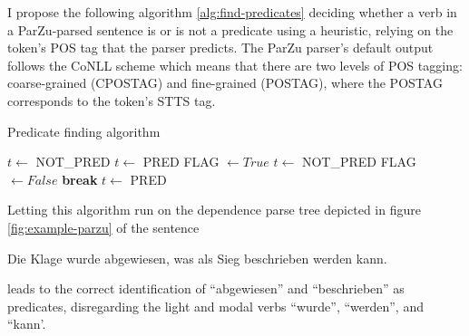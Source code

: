 
I propose the following algorithm \ref{alg:find-predicates} deciding whether a verb in a
ParZu-parsed sentence is or is not a predicate using a heuristic, relying on the token's
POS tag that the parser predicts. The ParZu parser's default output follows the CoNLL
scheme \citep{buchholz2006conll} which means that there are two levels of POS tagging:
coarse-grained (CPOSTAG) and fine-grained (POSTAG), where the POSTAG corresponds to the
token's STTS tag.

\begin{algorithm}
\caption{Predicate finding algorithm}
\label{alg:find-predicates}
	\begin{algorithmic}[1]
			\STATE $t \leftarrow$ NOT\_PRED
		\ELSE
				\STATE $t \leftarrow$ PRED
			\ELSE
				\STATE FLAG $\leftarrow True$
						\STATE $t \leftarrow$ NOT\_PRED
						\STATE FLAG $\leftarrow False$
						\STATE \textbf{break}
					\ENDIF
				\ENDFOR
				\IF{FLAG $= True$}
					\STATE $t \leftarrow$ PRED
				\ENDIF
			\ENDIF
		\ENDIF
	\ENDFOR
\end{algorithmic}
\end{algorithm}


Letting this algorithm run on the dependence parse tree depicted in figure \ref{fig:example-parzu}
of the sentence

\begin{examples}
	\item \label{ex:multiple-predicates} Die Klage wurde abgewiesen, was als Sieg beschrieben werden kann.
\end{examples}

leads to the correct identification of ``abgewiesen'' and ``beschrieben'' as predicates,
disregarding the light and modal verbs ``wurde'', ``werden'', and ``kann'.

